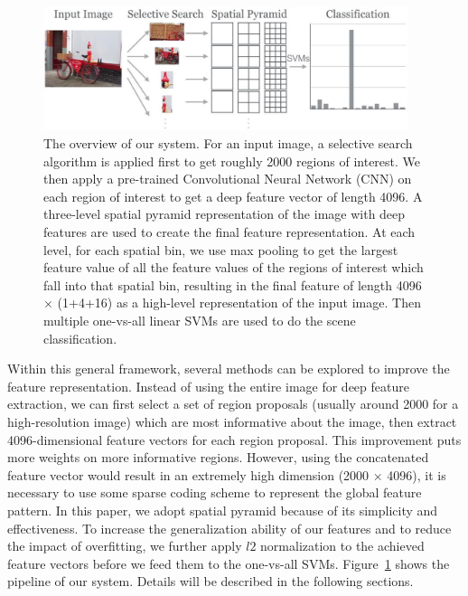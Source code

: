 \begin{figure}[ht]
  \centering
  \includegraphics[width=0.95\textwidth]{img/overview.pdf}
  \centering
  \caption{The overview of our system. For an input image, a selective search
  algorithm is applied first to get roughly 2000 regions of interest. We then
  apply a pre-trained Convolutional Neural Network (CNN) on each region of
  interest to get a deep feature vector of length 4096. A three-level spatial
  pyramid representation of the image with deep features are used to create the
  final feature representation. At each level, for each spatial bin, we use max
  pooling to get the largest feature value of all the feature values of the
  regions of interest which fall into that spatial bin, resulting in the final
  feature of length 4096 $\times$ (1+4+16) as a high-level
  representation of the input image. Then multiple one-vs-all linear SVMs are
  used to do the scene classification.} \label{fig:system_overview}
\end{figure}

Within this general framework, several methods can be explored to improve the
feature representation. Instead of using the entire image for deep feature
extraction, we can first select a set of region proposals (usually around 2000
for a high-resolution image) which are most informative about the image, then
extract 4096-dimensional feature vectors for each region proposal. This
improvement puts more weights on more informative regions. However, using the
concatenated feature vector would result in an extremely high dimension (2000
$\times$ 4096), it is necessary to use some sparse coding scheme to represent
the global feature pattern. In this paper, we adopt spatial pyramid because of
its simplicity and effectiveness. To increase the generalization ability of our
features and to reduce the impact of overfitting, we further apply $l2$
normalization to the achieved feature vectors before we feed them to the
one-vs-all SVMs. Figure~\ref{fig:system_overview} shows the pipeline of our
system. Details will be described in the following sections.

